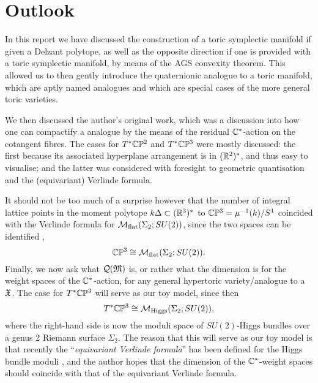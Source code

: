 \chapter{Outlook}

In this report we have discussed the construction of a toric symplectic manifold if given a Delzant polytope, as well as the opposite direction if one is provided with a toric symplectic manifold, by means of the AGS convexity theorem. This allowed us to then gently introduce the quaternionic analogue to a toric manifold, which are aptly named \HK analogues and which are special cases of the more general toric \HK varieties.

We then discussed the author's original work, which was a discussion into how one can compactify a \HK analogue by the means of the residual $\mathbb{C}^{\ast}$-action on the cotangent fibres. The cases for $T^{\ast}\mathbb{C}\mathbb{P}^{2}$ and $T^{\ast}\mathbb{C}\mathbb{P}^{3}$ were mostly discussed: the first because its associated hyperplane arrangement is in $(\mathbb{R}^{2})^{\ast}$, and thus easy to visualise; and the latter was considered with foresight to geometric quantisation and the (equivariant) Verlinde formula.

It should not be too much of a surprise however that the number of integral lattice points in the moment polytope $k\Delta \subset (\mathbb{R}^{3})^{\ast}$ to $\mathbb{C}\mathbb{P}^{3} = \mu^{-1}(k)/S^{1}$ coincided with the Verlinde formula for $\mathcal{M}_{\text{flat}}(\Sigma_{2};SU(2))$, since the two spaces can be identified \cite{NR69}, \ie
$$
	\mathbb{C}\mathbb{P}^{3} \cong \mathcal{M}_{\text{flat}}(\Sigma_{2};SU(2)).
$$
Finally, we now ask what $\mathcal{Q}(\mathfrak{M})$ is, or rather what the dimension is for the weight spaces of the $\mathbb{C}^{\ast}$-action, for any general hypertoric variety/analogue to a \K $\mathfrak{X}$. The case for $T^{\ast}\mathbb{C}\mathbb{P}^{3}$ will serve as our toy model, since then
$$
	T^{\ast}\mathbb{C}\mathbb{P}^{3} \cong \mathcal{M}_{\text{Higgs}}(\Sigma_{2};SU(2)),
$$
where the right-hand side is now the moduli space of $SU(2)$-Higgs bundles over a genus 2 Riemann surface $\Sigma_{2}$. The reason that this will serve as our toy model is that recently the ``\emph{equivariant Verlinde formula}'' has been defined for the Higgs bundle moduli \cite{GP17}, and the author hopes that the dimension of the $\mathbb{C}^{\ast}$-weight spaces should coincide with that of the equivariant Verlinde formula.